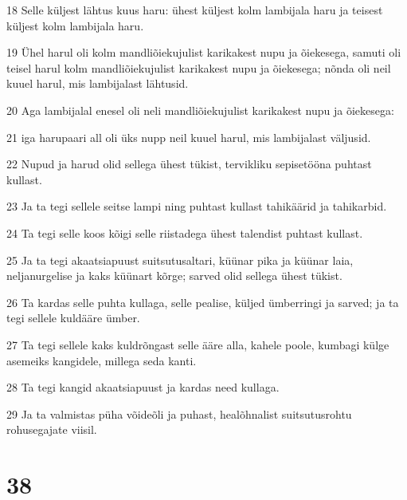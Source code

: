 \par 18 Selle küljest lähtus kuus haru: ühest küljest kolm lambijala haru ja teisest küljest kolm lambijala haru.
\par 19 Ühel harul oli kolm mandliõiekujulist karikakest nupu ja õiekesega, samuti oli teisel harul kolm mandliõiekujulist karikakest nupu ja õiekesega; nõnda oli neil kuuel harul, mis lambijalast lähtusid.
\par 20 Aga lambijalal enesel oli neli mandliõiekujulist karikakest nupu ja õiekesega:
\par 21 iga harupaari all oli üks nupp neil kuuel harul, mis lambijalast väljusid.
\par 22 Nupud ja harud olid sellega ühest tükist, tervikliku sepisetööna puhtast kullast.
\par 23 Ja ta tegi sellele seitse lampi ning puhtast kullast tahikäärid ja tahikarbid.
\par 24 Ta tegi selle koos kõigi selle riistadega ühest talendist puhtast kullast.
\par 25 Ja ta tegi akaatsiapuust suitsutusaltari, küünar pika ja küünar laia, neljanurgelise ja kaks küünart kõrge; sarved olid sellega ühest tükist.
\par 26 Ta kardas selle puhta kullaga, selle pealise, küljed ümberringi ja sarved; ja ta tegi sellele kuldääre ümber.
\par 27 Ta tegi sellele kaks kuldrõngast selle ääre alla, kahele poole, kumbagi külge asemeiks kangidele, millega seda kanti.
\par 28 Ta tegi kangid akaatsiapuust ja kardas need kullaga.
\par 29 Ja ta valmistas püha võideõli ja puhast, healõhnalist suitsutusrohtu rohusegajate viisil.

\chapter{38}

